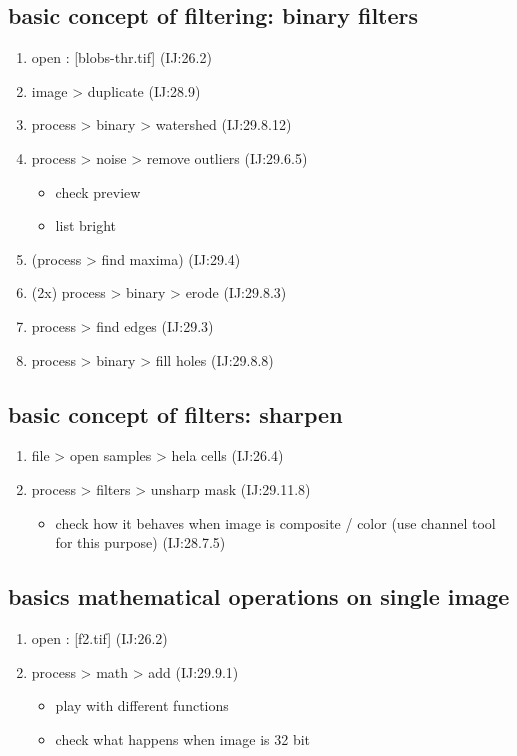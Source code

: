 \documentclass[11pt]{article}
\begin{document}
\subsection{basic concept of filtering: binary filters}
\label{sec-3-2}
\begin{enumerate}
\item open : [blobs-thr.tif] (IJ:26.2)
\item image > duplicate (IJ:28.9)
\item process > binary > watershed (IJ:29.8.12)
\item process > noise > remove outliers (IJ:29.6.5)
\begin{itemize}
\item check preview
\item list bright
\end{itemize}
\item (process > find maxima) (IJ:29.4)
\item (2x) process > binary > erode (IJ:29.8.3)
\item process > find edges (IJ:29.3)
\item process > binary > fill holes (IJ:29.8.8)
\end{enumerate}

\subsection{basic concept of filters: sharpen}
\label{sec-3-3}
\begin{enumerate}
\item file > open samples > hela cells (IJ:26.4)
\item process > filters > unsharp mask (IJ:29.11.8)
\begin{itemize}
\item check how it behaves when image is composite / color (use channel tool for this purpose) (IJ:28.7.5)
\end{itemize}
\end{enumerate}

\subsection{basics mathematical operations on single image}
\label{sec-3-4}
\begin{enumerate}
\item open : [f2.tif] (IJ:26.2)
\item process > math > add (IJ:29.9.1)
\begin{itemize}
\item play with different functions
\item check what happens when image is 32 bit
\end{itemize}
\end{enumerate}
\end{document}

